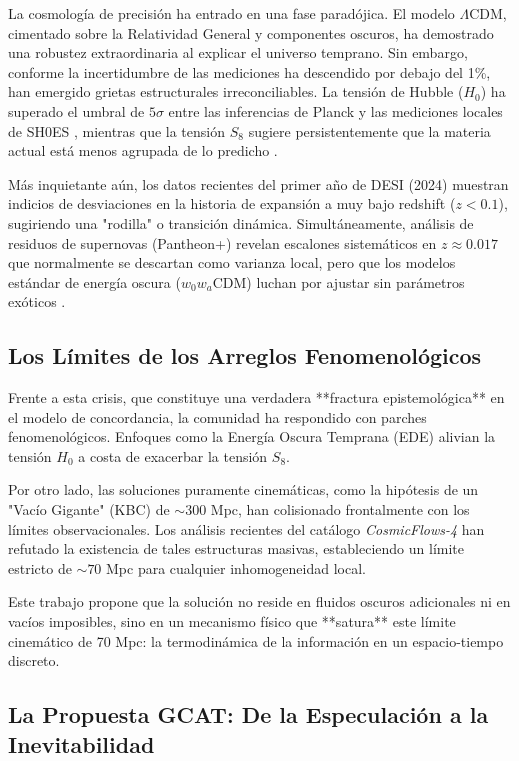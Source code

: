 \documentclass[12pt, a4paper]{article}
\theoremstyle{plain}
\theoremstyle{definition}
\begin{document}
La cosmología de precisión ha entrado en una fase paradójica. El modelo $\Lambda$CDM, cimentado sobre la Relatividad General y componentes oscuros, ha demostrado una robustez extraordinaria al explicar el universo temprano. Sin embargo, conforme la incertidumbre de las mediciones ha descendido por debajo del 1\%, han emergido grietas estructurales irreconciliables. La tensión de Hubble ($H_0$) ha superado el umbral de $5\sigma$ entre las inferencias de Planck y las mediciones locales de SH0ES \cite{Riess2022}, mientras que la tensión $S_8$ sugiere persistentemente que la materia actual está menos agrupada de lo predicho \cite{KiDS2021, DES2022}.

Más inquietante aún, los datos recientes del primer año de DESI (2024) muestran indicios de desviaciones en la historia de expansión a muy bajo redshift ($z < 0.1$), sugiriendo una "rodilla" o transición dinámica. Simultáneamente, análisis de residuos de supernovas (Pantheon+) revelan escalones sistemáticos en $z \approx 0.017$ que normalmente se descartan como varianza local, pero que los modelos estándar de energía oscura ($w_0w_a$CDM) luchan por ajustar sin parámetros exóticos \cite{DESI2024, Brout2022}.

\subsection{Los Límites de los Arreglos Fenomenológicos}

Frente a esta crisis, que constituye una verdadera **fractura epistemológica** en el modelo de concordancia, la comunidad ha respondido con parches fenomenológicos. Enfoques como la Energía Oscura Temprana (EDE) alivian la tensión $H_0$ a costa de exacerbar la tensión $S_8$. 

Por otro lado, las soluciones puramente cinemáticas, como la hipótesis de un "Vacío Gigante" (KBC) de $\sim 300$ Mpc, han colisionado frontalmente con los límites observacionales. Los análisis recientes del catálogo \textit{CosmicFlows-4} \cite{Mazurenko2024} han refutado la existencia de tales estructuras masivas, estableciendo un límite estricto de $\sim 70$ Mpc para cualquier inhomogeneidad local.

Este trabajo propone que la solución no reside en fluidos oscuros adicionales ni en vacíos imposibles, sino en un mecanismo físico que **satura** este límite cinemático de 70 Mpc: la termodinámica de la información en un espacio-tiempo discreto.

\subsection{La Propuesta GCAT: De la Especulación a la Inevitabilidad}
\end{document}
